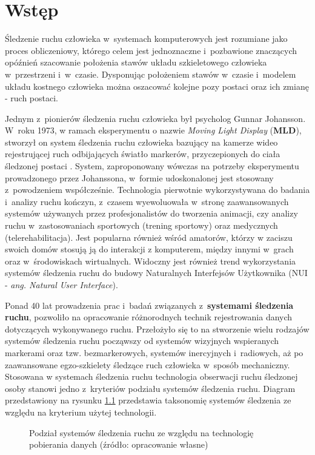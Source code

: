 
\chapter{Wstęp}\label{chap:intro}
Śledzenie ruchu człowieka w~systemach komputerowych jest rozumiane jako proces obliczeniowy, którego celem jest jednoznaczne i~pozbawione znaczących opóźnień szacowanie położenia stawów układu szkieletowego człowieka w~przestrzeni i~w~czasie. Dysponując położeniem stawów w~czasie i~modelem układu kostnego człowieka można oszacować kolejne pozy postaci oraz ich zmianę - ruch postaci.

Jednym z~pionierów śledzenia ruchu człowieka był psycholog Gunnar Johansson. W~roku 1973, w ramach eksperymentu o nazwie \emph{Moving Light Display} (\textbf{MLD}), stworzył on system śledzenia ruchu człowieka bazujący na kamerze wideo rejestrującej ruch odbijających światło markerów, przyczepionych do ciała śledzonej postaci \cite{Johansson1973}. System, zaproponowany wówczas na potrzeby eksperymentu prowadzonego przez Johanssona, w~formie udoskonalonej jest stosowany z~powodzeniem współcześnie. Technologia pierwotnie wykorzystywana do badania i~analizy ruchu kończyn, z~czasem wyewoluowała w~stronę zaawansowanych systemów używanych przez profesjonalistów do tworzenia animacji, czy analizy ruchu w~zastosowaniach sportowych (trening sportowy) oraz medycznych (telerehabilitacja). Jest popularna również wśród amatorów, którzy w zaciszu swoich domów stosują ją do interakcji z komputerem, między innymi w~grach oraz w~środowiskach wirtualnych. Widoczny jest również trend wykorzystania systemów śledzenia ruchu do budowy Naturalnych Interfejsów Użytkownika\cite{Glonek_Pietruszka_2012} (NUI - \emph{ang. Natural User Interface}).

Ponad 40 lat prowadzenia prac i~badań związanych z~\textbf{systemami śledzenia ruchu}, pozwoliło na opracowanie różnorodnych technik rejestrowania danych dotyczących wykonywanego ruchu. Przełożyło się to na stworzenie wielu rodzajów systemów śledzenia ruchu począwszy od systemów wizyjnych wspieranych markerami oraz tzw. bezmarkerowych, systemów inercyjnych i~radiowych, aż po zaawansowane egzo-szkielety śledzące ruch człowieka w~sposób mechaniczny. Stosowana w systemach śledzenia ruchu technologia obserwacji ruchu śledzonej osoby stanowi jedno z~kryteriów podziału systemów śledzenia ruchu. Diagram przedstawiony na rysunku \ref{fig:literature:mocapSystems:diagram} przedstawia taksonomię systemów śledzenia ze względu na kryterium użytej technologii.

	\begin{figure}[!htb]
		\centering
		
		\caption{Podział systemów śledzenia ruchu ze względu na technologię pobierania danych (źródło: opracowanie własne)}
		\label{fig:literature:mocapSystems:diagram}
	\end{figure}

